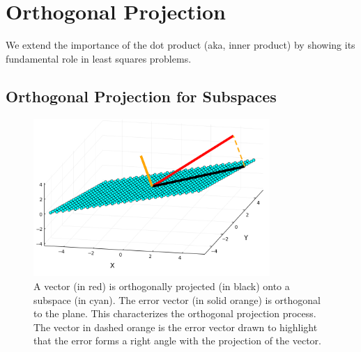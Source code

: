 \section{Orthogonal Projection}
\label{sec:OrthogonalProjection}

We extend the importance of the dot product (aka, inner product) by showing its fundamental role in least squares problems. \\

\subsection{Orthogonal Projection for Subspaces}
 \vspace*{0.2cm}
\begin{figure}[hbt!]
\centering
\includegraphics[width=0.8\textwidth]{graphics/Chap13SeparatingHyperplanes/orthogonalProjectionImage.png}
\caption[]{A vector (in red) is orthogonally projected (in black) onto a subspace (in cyan). The error vector (in solid orange) is orthogonal to the plane. This characterizes the orthogonal projection process. The vector in dashed orange is the error vector drawn to highlight that the error forms a right angle with the projection of the vector. } 
\label{fig:SimpleOrthongalProjection}
\end{figure}

\vspace*{0.2cm}

